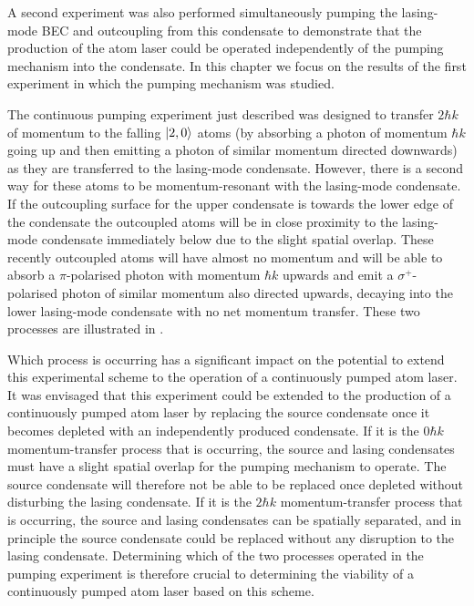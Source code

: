 A second experiment was also performed simultaneously pumping the lasing-mode BEC and outcoupling from this condensate to demonstrate that the production of the atom laser could be operated independently of the pumping mechanism into the condensate.  In this chapter we focus on the results of the first experiment in which the pumping mechanism was studied.

\parasep

The continuous pumping experiment just described was designed to transfer $2 \hbar k$ of momentum to the falling ${\left|2, 0\right>}$ atoms (by absorbing a photon of momentum $\hbar k$ going up and then emitting a photon of similar momentum directed downwards) as they are transferred to the lasing-mode condensate.  However, there is a second way for these atoms to be momentum-resonant with the lasing-mode condensate.  If the outcoupling surface for the upper condensate is towards the lower edge of the condensate the outcoupled atoms will be in close proximity to the lasing-mode condensate immediately below due to the slight spatial overlap.  These recently outcoupled atoms will have almost no momentum and will be able to absorb a $\pi$-polarised photon with momentum $\hbar k$ upwards and emit a $\sigma^+$-polarised photon of similar momentum also directed upwards, decaying into the lower lasing-mode condensate with no net momentum transfer.  These two processes are illustrated in .

Which process is occurring has a significant impact on the potential to extend this experimental scheme to the operation of a continuously pumped atom laser.  It was envisaged that this experiment could be extended to the production of a continuously pumped atom laser by replacing the source condensate once it becomes depleted with an independently produced condensate.  If it is the $0 \hbar k$ momentum-transfer process that is occurring, the source and lasing condensates must have a slight spatial overlap for the pumping mechanism to operate.  The source condensate will therefore not be able to be replaced once depleted without disturbing the lasing condensate.  If it is the $2 \hbar k$ momentum-transfer process that is occurring, the source and lasing condensates can be spatially separated, and in principle the source condensate could be replaced without any disruption to the lasing condensate.  Determining which of the two processes operated in the pumping experiment is therefore crucial to determining the viability of a continuously pumped atom laser based on this scheme.

